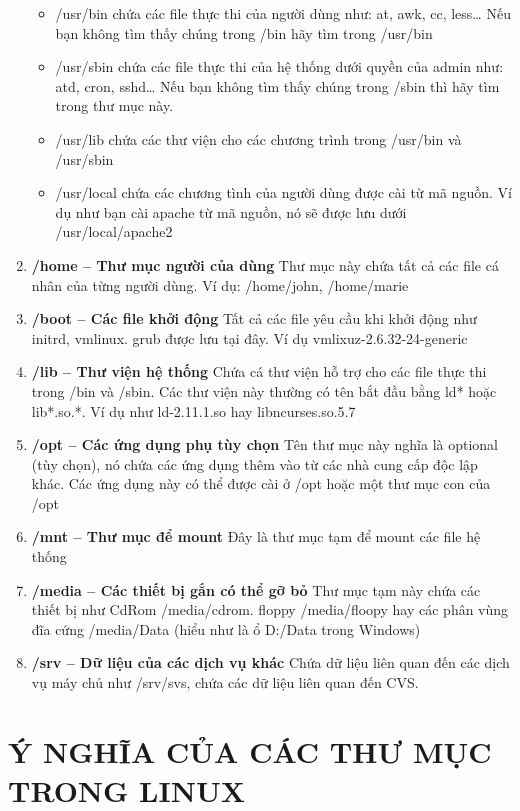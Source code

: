 \documentclass[twoside]{article}
\begin{document}
\begin{enumerate}
		\begin{itemize}
			\item /usr/bin chứa các file thực thi của người dùng như: at, awk, cc, less… Nếu bạn không tìm thấy chúng trong /bin hãy tìm trong /usr/bin
			\item /usr/sbin chứa các file thực thi của hệ thống dưới quyền của admin như: atd, cron, sshd… Nếu bạn không tìm thấy chúng trong /sbin thì hãy tìm trong thư mục này.
			\item /usr/lib chứa các thư viện cho các chương trình trong /usr/bin và /usr/sbin
			\item /usr/local chứa các chương tình của người dùng được cài từ mã nguồn. Ví dụ như bạn cài apache từ mã nguồn, nó sẽ được lưu dưới /usr/local/apache2
		\end{itemize}
		\item \textbf{/home – Thư mục người của dùng}
		Thư mục này chứa tất cả các file cá nhân của từng người dùng. Ví dụ: /home/john, /home/marie
		\item \textbf{/boot – Các file khởi động}
		Tất cả các file yêu cầu khi khởi động như initrd, vmlinux. grub được lưu tại đây. Ví dụ vmlixuz-2.6.32-24-generic
		\item \textbf{/lib – Thư viện hệ thống}
		Chứa cá thư viện hỗ trợ cho các file thực thi trong /bin và /sbin. Các thư viện này thường có tên bắt đầu bằng ld* hoặc lib*.so.*. Ví dụ như ld-2.11.1.so hay libncurses.so.5.7
		\item \textbf{/opt – Các ứng dụng phụ tùy chọn}
		Tên thư mục này nghĩa là optional (tùy chọn), nó chứa các ứng dụng thêm vào từ các nhà cung cấp độc lập khác. Các ứng dụng này có thể được cài ở /opt hoặc một thư mục con của /opt
		\item \textbf{/mnt – Thư mục để mount}
		Đây là thư mục tạm để mount các file hệ thống
		\item \textbf{/media – Các thiết bị gắn có thể gỡ bỏ}
		Thư mục tạm này chứa các thiết bị như CdRom /media/cdrom. floppy /media/floopy hay các phân vùng đĩa cứng /media/Data (hiểu như là ổ D:/Data trong Windows)
		\item \textbf{/srv – Dữ liệu của các dịch vụ khác}
		Chứa dữ liệu liên quan đến các dịch vụ máy chủ như /srv/svs, chứa các dữ liệu liên quan đến CVS.
	\end{enumerate}
\section{Ý NGHĨA CỦA CÁC THƯ MỤC TRONG LINUX}
\end{document}

